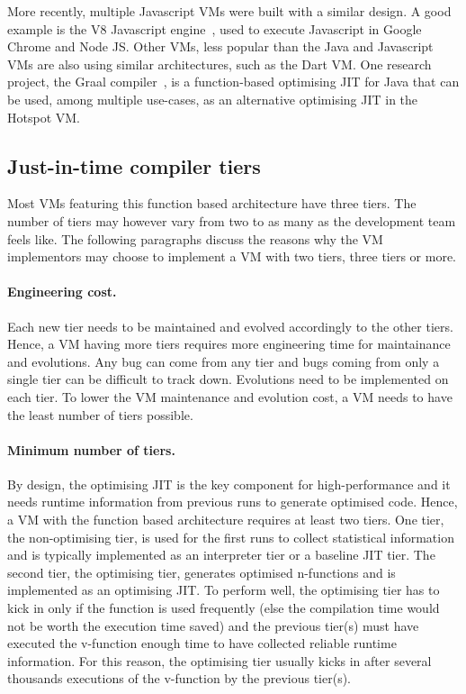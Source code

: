 \documentclass[a4paper,12pt,twoside]{../includes/ThesisStyle}
\begin{document}
More recently, multiple Javascript VMs were built with a similar design. A good example is the V8 Javascript engine~\cite{V8}, used to execute Javascript in Google Chrome and Node JS. Other VMs, less popular than the Java and Javascript VMs are also using similar architectures, such as the Dart VM. One research project, the Graal compiler~\cite{Oracle13,Dubo13c}, is a function-based optimising JIT for Java that can be used, among multiple use-cases, as an alternative optimising JIT in the Hotspot VM.

\subsection{Just-in-time compiler tiers}

Most VMs featuring this function based architecture have three tiers. The number of tiers may however vary from two to as many as the development team feels like. The following paragraphs discuss the reasons why the VM implementors may choose to implement a VM with two tiers, three tiers or more.

\paragraph{Engineering cost.} Each new tier needs to be maintained and evolved accordingly to the other tiers. Hence, a VM having more tiers requires more engineering time for maintainance and evolutions. Any bug can come from any tier and bugs coming from only a single tier can be difficult to track down. Evolutions need to be implemented on each tier. To lower the VM maintenance and evolution cost, a VM needs to have the least number of tiers possible.

\paragraph{Minimum number of tiers.} By design, the optimising JIT is the key component for high-performance and it needs runtime information from previous runs to generate optimised code. Hence, a VM with the function based architecture requires at least two tiers. One tier, the non-optimising tier, is used for the first runs to collect statistical information and is typically implemented as an interpreter tier or a baseline JIT tier. The second tier, the optimising tier, generates optimised n-functions and is implemented as an optimising JIT. To perform well, the optimising tier has to kick in only if the function is used frequently (else the compilation time would not be worth the execution time saved) and the previous tier(s) must have executed the v-function enough time to have collected reliable runtime information. For this reason, the optimising tier usually kicks in after several thousands executions of the v-function by the previous tier(s).
\end{document}
